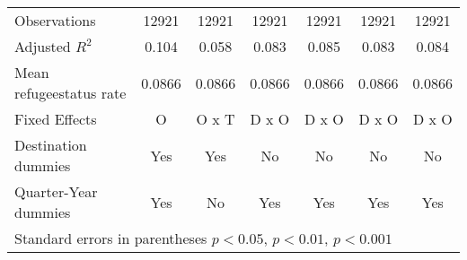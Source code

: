 \begin{table}[!ht]
\begin{tabular}{l*{6}{c}}
\hline
Observations        &       12921         &       12921         &       12921         &       12921         &       12921         &       12921         \\
Adjusted \(R^{2}\)  &       0.104         &       0.058         &       0.083         &       0.085         &       0.083         &       0.084         \\
Mean refugeestatus rate&      0.0866         &      0.0866         &      0.0866         &      0.0866         &      0.0866         &      0.0866         \\
Fixed Effects       &           O         &       O x T         &       D x O         &       D x O         &       D x O         &       D x O         \\
Destination dummies &         Yes         &         Yes         &          No         &          No         &          No         &          No         \\
Quarter-Year dummies&         Yes         &          No         &         Yes         &         Yes         &         Yes         &         Yes         \\
\hline\hline
\multicolumn{7}{l}{ Standard errors in parentheses \sym{*} \(p<0.05\), \sym{**} \(p<0.01\), \sym{***} \(p<0.001\)}\\
\end{tabular}
\end{table}
